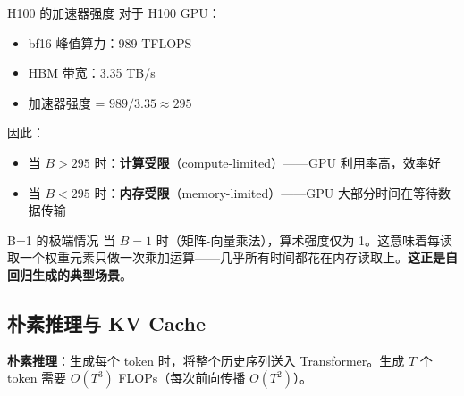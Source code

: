 \documentclass[a4paper]{article}
\begin{document}
\begin{importantbox}{H100 的加速器强度}
对于 H100 GPU：
\begin{itemize}
    \item bf16 峰值算力：989 TFLOPS
    \item HBM 带宽：3.35 TB/s
    \item 加速器强度 = $989 / 3.35 \approx 295$
\end{itemize}
因此：
\begin{itemize}
    \item 当 $B > 295$ 时：\textbf{计算受限}（compute-limited）——GPU 利用率高，效率好
    \item 当 $B < 295$ 时：\textbf{内存受限}（memory-limited）——GPU 大部分时间在等待数据传输
\end{itemize}
\end{importantbox}

\begin{warningbox}{B=1 的极端情况}
当 $B=1$ 时（矩阵-向量乘法），算术强度仅为 1。这意味着每读取一个权重元素只做一次乘加运算——几乎所有时间都花在内存读取上。\textbf{这正是自回归生成的典型场景}。
\end{warningbox}

\subsection{朴素推理与 KV Cache}

\textbf{朴素推理}：生成每个 token 时，将整个历史序列送入 Transformer。生成 $T$ 个 token 需要 $O(T^3)$ FLOPs（每次前向传播 $O(T^2)$）。
\end{document}
